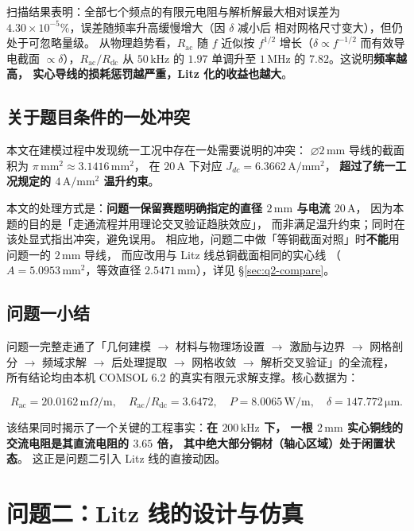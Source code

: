 \documentclass[12pt, a4paper]{ctexart}
\newcommand{\Rac}{R_{\mathrm{ac}}}
\newcommand{\Rdc}{R_{\mathrm{dc}}}
\newcommand{\U}[1]{\ensuremath{\,\mathrm{#1}}}
\newcommand{\Uohm}{\ensuremath{\,\mathrm{m}\Omega/\mathrm{m}}}%
\begin{document}
扫描结果表明：全部七个频点的有限元电阻与解析解最大相对误差为
$4.30\times10^{-5}\%$，误差随频率升高缓慢增大（因 $\delta$ 减小后
相对网格尺寸变大），但仍处于可忽略量级。
从物理趋势看，$\Rac$ 随 $f$ 近似按 $f^{1/2}$ 增长（$\delta \propto f^{-1/2}$
而有效导电截面 $\propto \delta$），$\Rac/\Rdc$ 从 $50\U{kHz}$ 的 $1.97$
单调升至 $1\U{MHz}$ 的 $7.82$。这说明\textbf{频率越高，
实心导线的损耗惩罚越严重，Litz 化的收益也越大}。

\subsection{关于题目条件的一处冲突}

本文在建模过程中发现统一工况中存在一处需要说明的冲突：
$\varnothing 2\U{mm}$ 导线的截面积为 $\pi\U{mm^2}\approx 3.1416\U{mm^2}$，
在 $20\U{A}$ 下对应 $J_{dc} = 6.3662\U{A/mm^2}$，
\textbf{超过了统一工况规定的 $4\U{A/mm^2}$ 温升约束}。

本文的处理方式是：\textbf{问题一保留赛题明确指定的直径 $2\U{mm}$ 与电流 $20\U{A}$}，
因为本题的目的是「走通流程并用理论交叉验证趋肤效应」，
而非满足温升约束；同时在该处显式指出冲突，避免误用。
相应地，问题二中做「等铜截面对照」时\textbf{不能}用问题一的 $2\U{mm}$ 导线，
而应改用与 Litz 线总铜截面相同的实心线
（$A = 5.0953\U{mm^2}$，等效直径 $2.5471\U{mm}$），详见 \S\ref{sec:q2-compare}。

\subsection{问题一小结}

问题一完整走通了「几何建模 $\to$ 材料与物理场设置 $\to$ 激励与边界 $\to$ 网格剖分 $\to$
频域求解 $\to$ 后处理提取 $\to$ 网格收敛 $\to$ 解析交叉验证」的全流程，
所有结论均由本机 COMSOL 6.2 的真实有限元求解支撑。核心数据为：

\begin{equation*}
\Rac = 20.0162\Uohm,\quad
\Rac/\Rdc = 3.6472,\quad
P = 8.0065\U{W/m},\quad
\delta = 147.772\U{\mu m}.
\end{equation*}

该结果同时揭示了一个关键的工程事实：\textbf{在 $200\U{kHz}$ 下，
一根 $2\U{mm}$ 实心铜线的交流电阻是其直流电阻的 $3.65$ 倍，
其中绝大部分铜材（轴心区域）处于闲置状态}。
这正是问题二引入 Litz 线的直接动因。

\section{问题二：Litz 线的设计与仿真}
\end{document}
